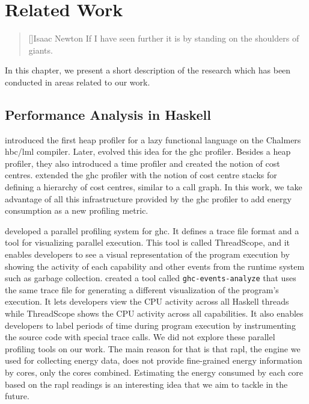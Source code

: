 \chapter{Related Work}\label{chp:related}

\begin{quotation}[]{Isaac Newton}
If I have seen further it is by standing on the shoulders of giants.
\end{quotation}

In this chapter, we present a short description of the research which has been conducted in areas related to our work.


\section{Performance Analysis in Haskell}
 introduced the first heap profiler for a lazy functional language on the Chalmers hbc/lml compiler. Later,  evolved this idea for the \ac{ghc} profiler. Besides a heap profiler, they also introduced a time profiler and created the notion of cost centres.  extended the \ac{ghc} profiler with the notion of cost centre stacks for defining a hierarchy of cost centres, similar to a call graph. In this work, we take advantage of all this infrastructure provided by the \ac{ghc} profiler to add energy consumption as a new profiling metric.

 developed a parallel profiling system for \ac{ghc}. It defines a trace file format and a tool for visualizing parallel execution. This tool is called ThreadScope, and it enables developers to see a visual representation of the program execution by showing the activity of each capability and other events from the runtime system such as garbage collection.  created a tool called \texttt{ghc-events-analyze} that uses the same trace file for generating a different visualization of the program's execution. It lets developers view the CPU activity across all Haskell threads while ThreadScope shows the CPU activity across all capabilities. It also enables developers to label periods of time during program execution by instrumenting the source code with special trace calls. We did not explore these parallel profiling tools on our work. The main reason for that is that \ac{rapl}, the engine we used for collecting energy data, does not provide fine-grained energy information by cores, only the cores combined. Estimating the energy consumed by each core based on the \ac{rapl} readings is an interesting idea that we aim to tackle in the future.

